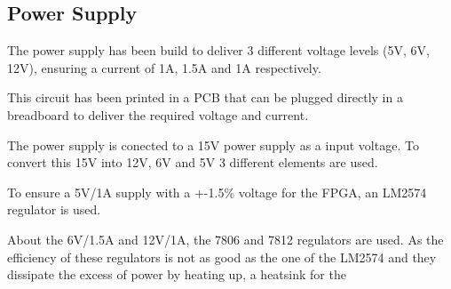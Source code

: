 
\subsection{Power Supply}
The power supply has been build to deliver 3 different voltage levels (5V, 6V, 12V), ensuring a current of 1A, 1.5A and 1A respectively.

This circuit has been printed in a PCB that can be plugged directly in a breadboard to deliver the required voltage and current.

The power supply is conected to a 15V power supply as a input voltage. To convert this 15V into 12V, 6V and 5V 3 different elements are used.

To ensure a 5V/1A supply with a +-1.5\% voltage for the FPGA, an LM2574 regulator is used. 

About the 6V/1.5A and 12V/1A, the 7806 and 7812 regulators are used. As the efficiency of these regulators is not as good as the one of the LM2574 and they dissipate the excess of power by heating up, a heatsink for the 